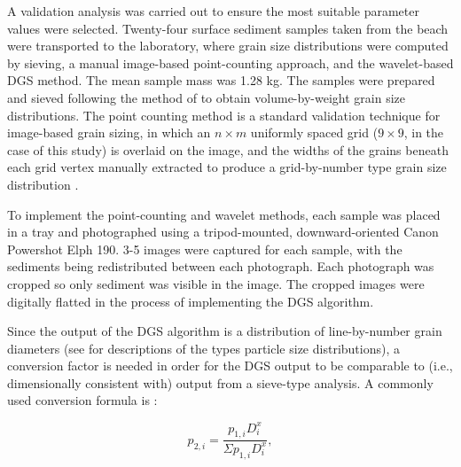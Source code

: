 \documentclass[jmse,article,submit,pdftex,moreauthors]{Definitions/mdpi}
\begin{document}
A validation analysis was carried out to ensure the most suitable parameter values were selected. Twenty-four surface sediment samples taken from the beach were transported to the laboratory, where grain size distributions were computed by sieving, a manual image-based point-counting approach, and the wavelet-based DGS method. The mean sample mass was 1.28 kg. The samples were prepared and sieved following the method of \citet{Ingram1971} to obtain volume-by-weight grain size distributions. The point counting method is a standard validation technique for image-based grain sizing, in which an $n\times m$ uniformly spaced grid ($9\times 9$, in the case of this study) is overlaid on the image, and the widths of the grains beneath each grid vertex manually extracted to produce a grid-by-number type grain size distribution \citep{Barnard_etal2007, Buscombe_etal2010}. 

To implement the point-counting and wavelet methods, each sample was placed in a tray and photographed using a tripod-mounted, downward-oriented Canon Powershot Elph 190. 3-5 images were captured for each sample, with the sediments being redistributed between each photograph. Each photograph was cropped so only sediment was visible in the image. The cropped images were digitally flatted in the process of implementing the DGS algorithm.

Since the output of the DGS algorithm is a distribution of line-by-number grain diameters (see \citet{Kellerhals_Bray1971, Church_etal1987} for descriptions of the types particle size distributions), a conversion factor is needed in order for the DGS output to be comparable to (i.e., dimensionally consistent with) output from a sieve-type analysis. A commonly used conversion formula is \citep{Kellerhals_Bray1971, Diplas_Sutherland1988, Cuttler_etal2017}:

\begin{equation}\label{eq:surface_area_to_volume}
p_{2,i} = \frac{p_{1,i} D_{i}^{x}}{\Sigma p_{1,i} D_{i}^{x}},
\end{equation}
\end{document}
